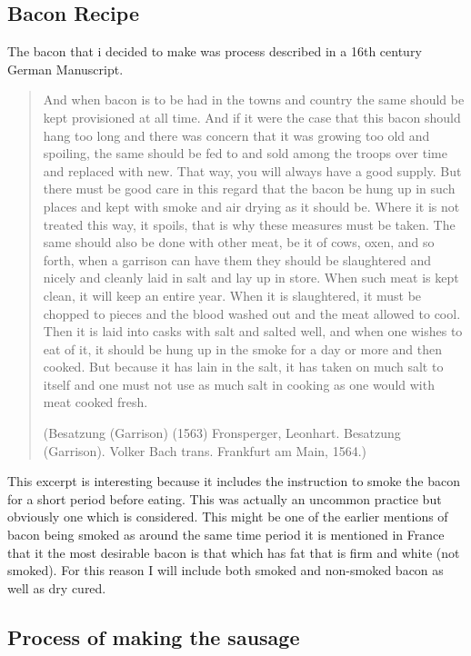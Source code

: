 \documentclass[letterpaper,11pt,leqno]{article}
\begin{document}
\subsection{Bacon Recipe}

The bacon that i decided to make was process described in a 16th century German Manuscript.

\begin{quote}
	And when bacon is to be had in the towns and country the same should be kept provisioned at all time. And if it were the case that this bacon should hang too long and there was concern that it was growing too old and spoiling, the same should be fed to and sold among the troops over time and replaced with new. That way, you will always have a good supply. But there must be good care in this regard that the bacon be hung up in such places and kept with smoke and air drying as it should be. Where it is not treated this way, it spoils, that is why these measures must be taken. The same should also be done with other meat, be it of cows, oxen, and so forth, when a garrison can have them they should be slaughtered and nicely and cleanly laid in salt and lay up in store. When such meat is kept clean, it will keep an entire year. When it is slaughtered, it must be chopped to pieces and the blood washed out and the meat allowed to cool. Then it is laid into casks with salt and salted well, and when one wishes to eat of it, it should be hung up in the smoke for a day or more and then cooked. But because it has lain in the salt, it has taken on much salt to itself and one must not use as much salt in cooking as one would with meat cooked fresh.
	
	(Besatzung (Garrison) (1563) Fronsperger, Leonhart.  Besatzung (Garrison).  Volker Bach trans.  Frankfurt am Main, 1564.)
\end{quote}

This excerpt is interesting because it includes the instruction to smoke the bacon for a short period before eating. This was actually an uncommon practice but obviously one which is considered. This might be one of the earlier mentions of bacon being smoked as around the same time period it is mentioned in France that it the most desirable bacon is that which has fat that is firm and white (not smoked). For this reason I will include both smoked and non-smoked bacon as well as dry cured.

\subsection{Process of making the sausage}
\end{document}

